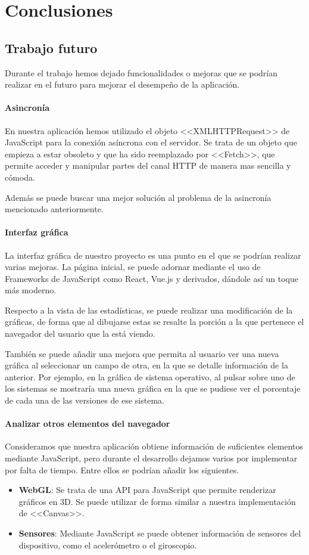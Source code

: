 \chapter{Conclusiones}

\section{Trabajo futuro}
Durante el trabajo hemos dejado funcionalidades o mejoras que se podrían realizar en el futuro para mejorar el desempeño de la aplicación.
\subsubsection{Asincronía}
En nuestra aplicación hemos utilizado el objeto <<XMLHTTPRequest>> de JavaScript para la conexión asíncrona con el servidor. Se trata de un objeto que empieza a estar obsoleto y que ha sido reemplazado por <<Fetch>>, que permite acceder y manipular partes del canal HTTP de manera mas sencilla y cómoda.\par 
Además se puede buscar una mejor solución al problema de la asincronía mencionado anteriormente.
\subsubsection{Interfaz gráfica}
La interfaz gráfica de nuestro proyecto es una punto en el que se podrían realizar varias mejoras. La página inicial, se puede adornar mediante el uso de Frameworks de JavaScript como React, Vue.js y derivados, dándole así un toque más moderno. \par 
Respecto a la vista de las estadísticas, se puede realizar una modificación de la gráficas, de forma que al dibujarse estas se resalte la porción a la que pertenece el navegador del usuario que la está viendo.\par 
También se puede añadir una mejora que permita al usuario ver una nueva gráfica al seleccionar un campo de otra, en la que se detalle información de la anterior. Por ejemplo, en la gráfica de sistema operativo, al pulsar sobre uno de los sistemas se mostraría una nueva gráfica en la que se pudiese ver el porcentaje de cada una de las versiones de ese sistema.
\subsubsection{Analizar otros elementos del navegador}
Consideramos que nuestra aplicación obtiene información de suficientes elementos mediante JavaScript, pero durante el desarrollo dejamos varios por implementar por falta de tiempo. Entre ellos se podrían añadir los siguientes.
\begin{itemize}
    \item \textbf{WebGL}: Se trata de una API para JavaScript que permite renderizar gráficos en 3D. Se puede utilizar de forma similar a nuestra implementación de <<Canvas>>.
    \item \textbf{Sensores}: Mediante JavaScript se puede obtener información de sensores del dispositivo, como el acelerómetro o el giroscopio.
\end{itemize}
